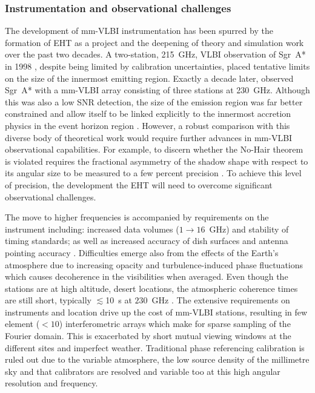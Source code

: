 \subsubsection{Instrumentation and observational challenges}\label{sec:eht_obs}

The development of mm-VLBI instrumentation has been spurred by the formation of EHT as a project and the deepening of theory and simulation work over the past two decades. A two-station, 215~GHz, VLBI observation of Sgr~A* in 1998 \citep{Krichbaum_1998}, despite being limited by calibration uncertainties, placed tentative limits on the size of the innermost emitting region. Exactly a decade later, \citet{Doeleman_2008} observed Sgr~A* with a mm-VLBI array consisting of three stations at 230~GHz. Although this was also a low SNR detection, the size of the emission region was far better constrained and allow itself to be linked explicitly to the innermost accretion physics in the event horizon region \citep[e.g.][]{Broderick_2011}. However, a robust comparison with this diverse body of theoretical work would require further advances in mm-VLBI observational capabilities. For example, to discern whether the No-Hair theorem is violated requires the fractional asymmetry of the shadow shape with respect to its angular size to be measured to a few percent precision \citep[e.g.][and references therein]{Goddi_2016}. To achieve this level of precision, the development the EHT will need to overcome significant observational challenges.

 
The move to higher frequencies is accompanied by requirements on the instrument including: increased data volumes ($1 \to 16$~GHz) and stability of timing standards; as well as increased accuracy of dish surfaces and antenna pointing accuracy \citep{Tilanus_2014}. Difficulties emerge also from the effects of the Earth's atmosphere due to increasing opacity and turbulence-induced phase fluctuations which causes decoherence in the visibilities when averaged. Even though the stations are at high altitude, desert locations, the atmospheric coherence times are still short, typically $\lesssim$10~s at $230$~GHz \citep{Doeleman_2009b}. The extensive requirements on instruments and location drive up the cost of mm-VLBI stations, resulting in few element ($<10$) interferometric arrays which make for sparse sampling of the Fourier domain. This is exacerbated by short mutual viewing windows at the different sites and imperfect weather. Traditional phase referencing calibration is ruled out due to the variable atmosphere, the low source density of the millimetre sky and that calibrators are resolved and variable too at this high angular resolution and frequency. 


